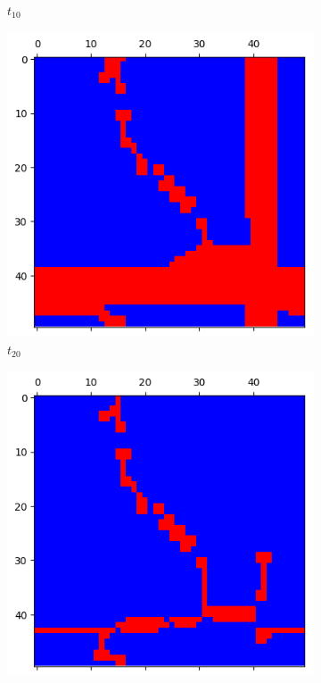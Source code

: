 \documentclass[letterpaper]{article}
\begin{document}
\begin{figure}[H]
\begin{subfigure}{.33\textwidth}
      \caption{$t_{10}$}
    \end{subfigure}
    \begin{subfigure}{.33\textwidth}
      \centering
      \includegraphics[width=1\linewidth]{images/assign2/part31-defect/t20}
      \caption{$t_{20}$}
    \end{subfigure}
    \begin{subfigure}{.33\textwidth}
      \centering
      \includegraphics[width=1\linewidth]{images/assign2/part31-defect/t40}

\end{subfigure}
\end{figure}
\end{document}
